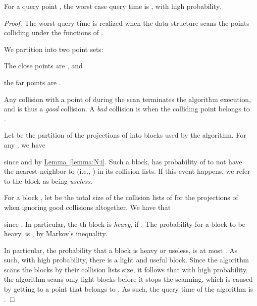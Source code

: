 \documentclass[12pt]{article}\usepackage[cm]{fullpage}
\theoremstyle{remark}\theoremheaderfont{\sf}\theorembodyfont{\upshape}\newtheorem{defn}[theorem]{Definition}
\numberwithin{figure}{section}\numberwithin{table}{section}\numberwithin{equation}{section}
\newcommand{\HLink}[2]{\hyperref[#2]{#1~\ref*{#2}}}
\newcommand{\lemlab}[1]{\label{lemma:#1}}
\newcommand{\lemref}[1]{\HLink{Lemma}{lemma:#1}}
\renewcommand{\th}{th\xspace}
\begin{document}
\begin{lemma}
    \lemlab{worst:case}For a query point , the worst case query time is
    , with high probability.
\end{lemma}
\begin{proof}
    The worst query time is realized when the data-structure scans the
    points colliding under the functions of .
    
    We partition  into two point sets:
    \smallskip \begin{compactenum}[\qquad (i)]
        \item The close points are
        , and
        \item the far points are
        .
    \end{compactenum}
    \smallskip Any collision with a point of  during the scan terminates
    the algorithm execution, and is thus a \emph{good} collision. A
    \emph{bad} collision is when the colliding point belongs to
    .

    Let  be the partition of the projections of
     into blocks used by the algorithm.  For any , we
    have
    
    since  and by \lemref{N:i}. Such a block,
    has probability of
     to not have the
    nearest-neighbor to  (i.e., ) in its collision
    lists.  If this event happens, we refer to the block as being
    \emph{useless}.

    For a block , let  be the total size of the collision
    lists of  for the projections of  when ignoring good
    collisions altogether. We have that
    
    since . In particular, the \th block is
    \emph{heavy}, if . The probability for a
    block to be heavy, is , by Markov's inequality.

    In particular, the probability that a block is heavy or useless,
    is at most . As such, with high probability,
    there is a light and useful block. Since the algorithm scans the
    blocks by their collision lists size, it follows that with high
    probability, the algorithm scans only light blocks before it stops
    the scanning, which is caused by getting to a point that belongs
    to . As such, the query time of the algorithm is
    .
\end{proof}
\end{document}
